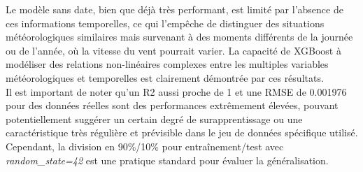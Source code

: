\documentclass[12pt]{article}
\begin{document}
Le modèle sans date, bien que déjà très performant, est limité par l'absence de ces informations temporelles, ce qui l'empêche de distinguer des situations météorologiques similaires mais survenant à des moments différents de la journée ou de l'année, où la vitesse du vent pourrait varier. La capacité de XGBoost à modéliser des relations non-linéaires complexes entre les multiples variables météorologiques et temporelles est clairement démontrée par ces résultats.\\

Il est important de noter qu'un R2 aussi proche de 1 et une RMSE de 0.001976 pour des données réelles sont des performances extrêmement élevées, pouvant potentiellement suggérer un certain degré de surapprentissage ou une caractéristique très régulière et prévisible dans le jeu de données spécifique utilisé. Cependant, la division en 90\%/10\% pour entraînement/test avec \textit{random\_state=42} est une pratique standard pour évaluer la généralisation.
\end{document}
